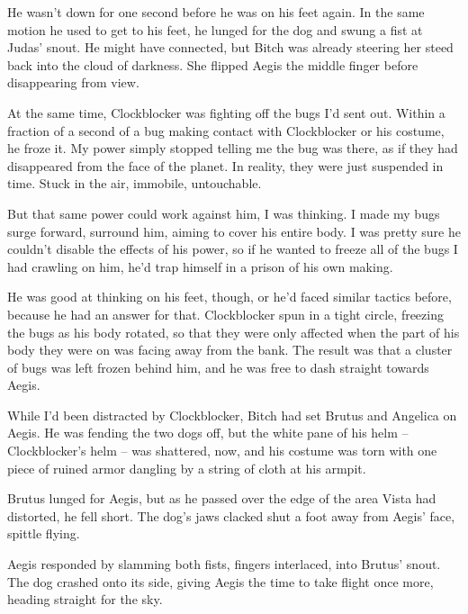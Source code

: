 He wasn't down for one second before he was on his feet again.  In the same motion he used to get to his feet, he lunged for the dog and swung a fist at Judas' snout.  He might have connected, but Bitch was already steering her steed back into the cloud of darkness.  She flipped Aegis the middle finger before disappearing from view.



At the same time, Clockblocker was fighting off the bugs I'd sent out.    Within a fraction of a second of a bug making contact with Clockblocker or his costume, he froze it.  My power simply stopped telling me the bug was there, as if they had disappeared from the face of the planet.  In reality, they were just suspended in time.  Stuck in the air, immobile, untouchable.



But that same power could work against him, I was thinking.  I made my bugs surge forward, surround him, aiming to cover his entire body.  I was pretty sure he couldn't disable the effects of his power, so if he wanted to freeze all of the bugs I had crawling on him, he'd trap himself in a prison of his own making.



He was good at thinking on his feet, though, or he'd faced similar tactics before, because he had an answer for that.  Clockblocker spun in a tight circle, freezing the bugs as his body rotated, so that they were only affected when the part of his body they were on was facing away from the bank.  The result was that a cluster of bugs was left frozen behind him, and he was free to dash straight towards Aegis.



While I'd been distracted by Clockblocker, Bitch had set Brutus and Angelica on Aegis.  He was fending the two dogs off, but the white pane of his helm – Clockblocker's helm – was shattered, now, and his costume was torn with one piece of ruined armor dangling by a string of cloth at his armpit.



Brutus lunged for Aegis, but as he passed over the edge of the area Vista had distorted, he fell short.  The dog's jaws clacked shut a foot away from Aegis' face, spittle flying.



Aegis responded by slamming both fists, fingers interlaced, into Brutus' snout.  The dog crashed onto its side, giving Aegis the time to take flight once more, heading straight for the sky.



